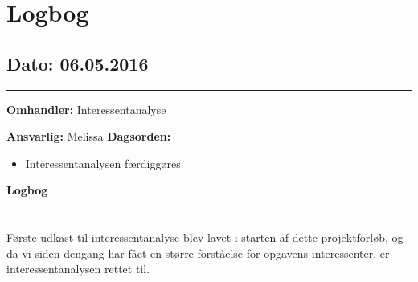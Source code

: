 \chapter{Logbog}

\section{Dato: 06.05.2016}
\hrule

\textbf{Omhandler:} Interessentanalyse

\textbf{Ansvarlig:} Melissa
\textbf{Dagsorden:}
\begin{itemize}
	\item Interessentanalysen færdiggøres
\end{itemize}

\textbf{Logbog}
\\
\\ \\
Første udkast til interessentanalyse blev lavet i starten af dette projektforløb, og da vi siden dengang har fået en større forståelse for opgavens interessenter, er interessentanalysen rettet til.